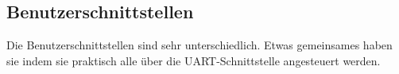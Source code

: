 \newpage
\subsection{Benutzerschnittstellen}
\label{sec:Inbetriebnahme_Benutzerschnittstellen}

Die Benutzerschnittstellen sind sehr unterschiedlich. Etwas gemeinsames haben sie indem sie praktisch alle über die UART-Schnittstelle angesteuert werden.

